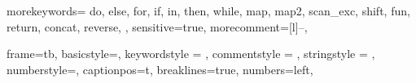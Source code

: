 {
  morekeywords={
    do,
    else,
    for,
    if,
    in,
    then,
    while,
    map,
    map2,
    scan_exc,
    shift,
    fun,
    return,
    concat,
    reverse,
  },
  sensitive=true,
  morecomment=[l]{--},
}

{
  frame=tb,
  basicstyle=\footnotesize\ttfamily,
  keywordstyle = \color{RoyalBlue},
  commentstyle = \color{ForestGreen},
  stringstyle = \color{purple},
  numberstyle=\scriptsize\color{darkgray},
  captionpos=t,
  breaklines=true,
  numbers=left,
}

\lstset{style=myStyle}  



